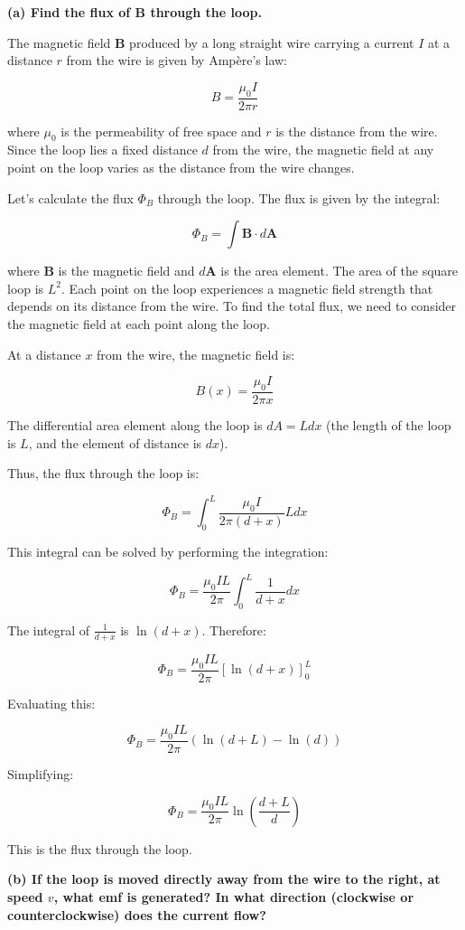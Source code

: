 \documentclass{article}
\begin{document}
\textbf{(a) Find the flux of $\mathbf{B}$ through the loop.}

The magnetic field $\mathbf{B}$ produced by a long straight wire carrying a current $I$ at a distance $r$ from the wire is given by Ampère's law:

\[
B = \frac{\mu_0 I}{2 \pi r}
\]

where $\mu_0$ is the permeability of free space and $r$ is the distance from the wire. Since the loop lies a fixed distance $d$ from the wire, the magnetic field at any point on the loop varies as the distance from the wire changes.

Let’s calculate the flux $\Phi_B$ through the loop. The flux is given by the integral:

\[
\Phi_B = \int \mathbf{B} \cdot d\mathbf{A}
\]

where $\mathbf{B}$ is the magnetic field and $d\mathbf{A}$ is the area element. The area of the square loop is $L^2$. Each point on the loop experiences a magnetic field strength that depends on its distance from the wire. To find the total flux, we need to consider the magnetic field at each point along the loop.

At a distance $x$ from the wire, the magnetic field is:

\[
B(x) = \frac{\mu_0 I}{2 \pi x}
\]

The differential area element along the loop is $dA = L dx$ (the length of the loop is $L$, and the element of distance is $dx$).

Thus, the flux through the loop is:

\[
\Phi_B = \int_0^L \frac{\mu_0 I}{2 \pi (d + x)} L dx
\]

This integral can be solved by performing the integration:

\[
\Phi_B = \frac{\mu_0 I L}{2 \pi} \int_0^L \frac{1}{d + x} dx
\]

The integral of $\frac{1}{d + x}$ is $\ln(d + x)$. Therefore:

\[
\Phi_B = \frac{\mu_0 I L}{2 \pi} \left[ \ln(d + x) \right]_0^L
\]

Evaluating this:

\[
\Phi_B = \frac{\mu_0 I L}{2 \pi} \left( \ln(d + L) - \ln(d) \right)
\]

Simplifying:

\[
\Phi_B = \frac{\mu_0 I L}{2 \pi} \ln\left( \frac{d + L}{d} \right)
\]

This is the flux through the loop.

\textbf{(b) If the loop is moved directly away from the wire to the right, at speed $v$, what emf is generated? In what direction (clockwise or counterclockwise) does the current flow?}
\end{document}
